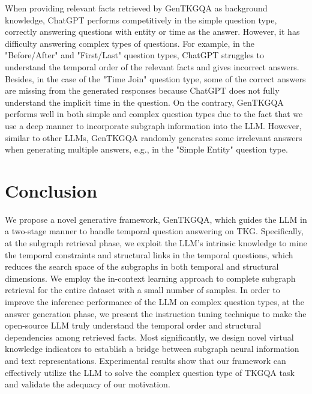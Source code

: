 \documentclass[11pt]{article}
\begin{document}
When providing relevant facts retrieved by GenTKGQA as background knowledge, ChatGPT performs competitively in the simple question type, correctly answering questions with entity or time as the answer. However, it has difficulty answering complex types of questions. 
For example, in the "Before/After" and "First/Last" question types, ChatGPT struggles to understand the temporal order of the relevant facts and gives incorrect answers. 
Besides, in the case of the "Time Join" question type, some of the correct answers are missing from the generated responses because ChatGPT does not fully understand the implicit time in the question.
On the contrary, GenTKGQA performs well in both simple and complex question types due to the fact that we use a deep manner to incorporate subgraph information into the LLM.
However, similar to other LLMs, GenTKGQA randomly generates some irrelevant answers when generating multiple answers, e.g., in the "Simple Entity" question type.







\section{Conclusion}

We propose a novel generative framework, GenTKGQA, which guides the LLM in a two-stage manner to handle temporal question answering on TKG.
Specifically, at the subgraph retrieval phase, we exploit the LLM's intrinsic knowledge to mine the temporal constraints and structural links in the temporal questions, which reduces the search space of the subgraphs in both temporal and structural dimensions. 
We employ the in-context learning approach to complete subgraph retrieval for the entire dataset with a small number of samples.
In order to improve the inference performance of the LLM on complex question types, at the answer generation phase, we present the instruction tuning technique to make the open-source LLM truly understand the temporal order and structural dependencies among retrieved facts. 
Most significantly, we design novel virtual knowledge indicators to establish a bridge between subgraph neural information and text representations. 
Experimental results show that our framework can effectively utilize the LLM to solve the complex question type of TKGQA task and validate the adequacy of our motivation.
\end{document}
